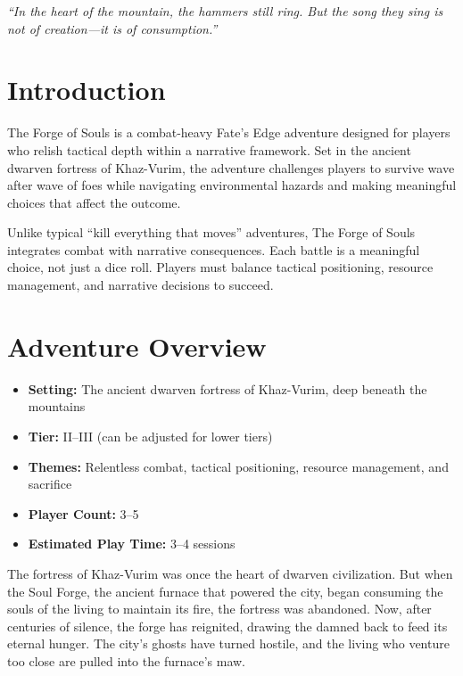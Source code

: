 \documentclass[11pt]{article}
\begin{document}




\begin{center}
\textit{``In the heart of the mountain, the hammers still ring. But the song they sing is not of creation---it is of consumption.''}
\end{center}


\section{Introduction}

The Forge of Souls is a combat-heavy Fate's Edge adventure designed for players who relish tactical depth within a narrative framework. Set in the ancient dwarven fortress of Khaz-Vurim, the adventure challenges players to survive wave after wave of foes while navigating environmental hazards and making meaningful choices that affect the outcome.

Unlike typical ``kill everything that moves'' adventures, The Forge of Souls integrates combat with narrative consequences. Each battle is a meaningful choice, not just a dice roll. Players must balance tactical positioning, resource management, and narrative decisions to succeed.

\section{Adventure Overview}

\begin{itemize}
    \item \textbf{Setting:} The ancient dwarven fortress of Khaz-Vurim, deep beneath the mountains
    \item \textbf{Tier:} II--III (can be adjusted for lower tiers)
    \item \textbf{Themes:} Relentless combat, tactical positioning, resource management, and sacrifice
    \item \textbf{Player Count:} 3--5
    \item \textbf{Estimated Play Time:} 3--4 sessions
\end{itemize}

The fortress of Khaz-Vurim was once the heart of dwarven civilization. But when the Soul Forge, the ancient furnace that powered the city, began consuming the souls of the living to maintain its fire, the fortress was abandoned. Now, after centuries of silence, the forge has reignited, drawing the damned back to feed its eternal hunger. The city's ghosts have turned hostile, and the living who venture too close are pulled into the furnace's maw.
\end{document}
